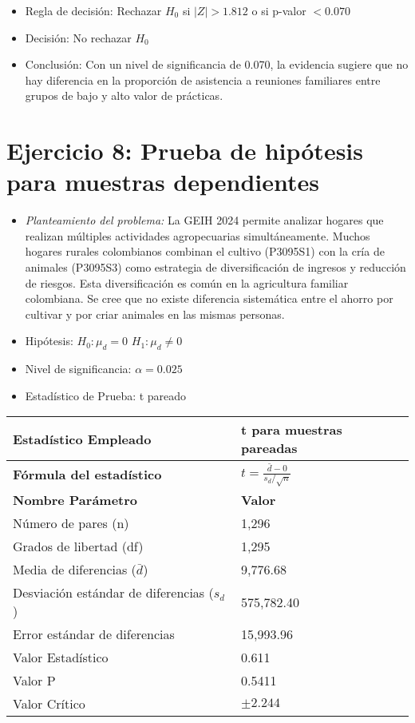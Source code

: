 \documentclass[12pt,a4paper]{article}
\begin{document}
\begin{itemize}
    \item Regla de decisión: Rechazar $H_0$ si $|Z| > 1.812$ o si p-valor $< 0.070$
    \item Decisión: No rechazar $H_0$
    \item Conclusión: Con un nivel de significancia de 0.070, la evidencia sugiere que no hay diferencia en la proporción de asistencia a reuniones familiares entre grupos de bajo y alto valor de prácticas.
\end{itemize}

\section*{Ejercicio 8: Prueba de hipótesis para muestras dependientes}
\begin{itemize}
    \item \textit{Planteamiento del problema:} La GEIH 2024 permite analizar hogares que realizan múltiples actividades agropecuarias simultáneamente. Muchos hogares rurales colombianos combinan el cultivo (P3095S1) con la cría de animales (P3095S3) como estrategia de diversificación de ingresos y reducción de riesgos. Esta diversificación es común en la agricultura familiar colombiana. Se cree que no existe diferencia sistemática entre el ahorro por cultivar y por criar animales en las mismas personas.
    \item Hipótesis: \quad $H_{0}: \mu_d = 0$ \hspace{2cm} $H_{1}: \mu_d \neq 0$
    \item Nivel de significancia: $\alpha = 0.025$
    \item Estadístico de Prueba: t pareado
\end{itemize}

\begin{tabular}{|m{7cm}|m{7cm}|}
\hline
\textbf{Estadístico Empleado} & t para muestras pareadas \\ \hline
\textbf{Fórmula del estadístico} & $t = \frac{\bar{d} - 0}{s_d/\sqrt{n}}$ \\ \hline
\textbf{Nombre Parámetro} & \textbf{Valor} \\ \hline
Número de pares (n) & 1,296 \\ \hline
Grados de libertad (df) & 1,295 \\ \hline
Media de diferencias ($\bar{d}$) & 9,776.68 \\ \hline
Desviación estándar de diferencias ($s_d$) & 575,782.40 \\ \hline
Error estándar de diferencias & 15,993.96 \\ \hline
Valor Estadístico & 0.611 \\ \hline
Valor P & 0.5411 \\ \hline
Valor Crítico & $\pm 2.244$ \\ \hline
\end{tabular}
\end{document}
